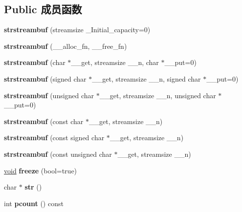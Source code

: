 \subsection*{Public 成员函数}
\begin{DoxyCompactItemize}
\item 
\mbox{\label{classstrstreambuf_ae43a297e873fd120204b4fbc77433278}} 
{\bfseries strstreambuf} (streamsize \+\_\+\+Initial\+\_\+capacity=0)
\item 
\mbox{\label{classstrstreambuf_a5b93ed7c241069ae6bc9655a4516b773}} 
{\bfseries strstreambuf} (\+\_\+\+\_\+alloc\+\_\+fn, \+\_\+\+\_\+free\+\_\+fn)
\item 
\mbox{\label{classstrstreambuf_aef32b3d0e86c0eadd90d960f779db0bc}} 
{\bfseries strstreambuf} (char $\ast$\+\_\+\+\_\+get, streamsize \+\_\+\+\_\+n, char $\ast$\+\_\+\+\_\+put=0)
\item 
\mbox{\label{classstrstreambuf_a94f6d55cecb6c7478abe1646b72abc89}} 
{\bfseries strstreambuf} (signed char $\ast$\+\_\+\+\_\+get, streamsize \+\_\+\+\_\+n, signed char $\ast$\+\_\+\+\_\+put=0)
\item 
\mbox{\label{classstrstreambuf_a788469386707ace5df036b4db652fcc5}} 
{\bfseries strstreambuf} (unsigned char $\ast$\+\_\+\+\_\+get, streamsize \+\_\+\+\_\+n, unsigned char $\ast$\+\_\+\+\_\+put=0)
\item 
\mbox{\label{classstrstreambuf_a13fb9ac2da4467f092d3bf01a62de9ee}} 
{\bfseries strstreambuf} (const char $\ast$\+\_\+\+\_\+get, streamsize \+\_\+\+\_\+n)
\item 
\mbox{\label{classstrstreambuf_a7f98440f4ad5e69f0797f2f669a6f39a}} 
{\bfseries strstreambuf} (const signed char $\ast$\+\_\+\+\_\+get, streamsize \+\_\+\+\_\+n)
\item 
\mbox{\label{classstrstreambuf_a7957ab4d2b448690f8f26dcf05ce478b}} 
{\bfseries strstreambuf} (const unsigned char $\ast$\+\_\+\+\_\+get, streamsize \+\_\+\+\_\+n)
\item 
\mbox{\label{classstrstreambuf_a2f1f667e8f096a2d85b7fa9ea6e30a77}} 
\hyperlink{interfacevoid}{void} {\bfseries freeze} (bool=true)
\item 
\mbox{\label{classstrstreambuf_ac9cc2a922403d370a34ea5c2bb90adec}} 
char $\ast$ {\bfseries str} ()
\item 
\mbox{\label{classstrstreambuf_a33fc21ae316b075863e766413a39920b}} 
int {\bfseries pcount} () const
\end{DoxyCompactItemize}
